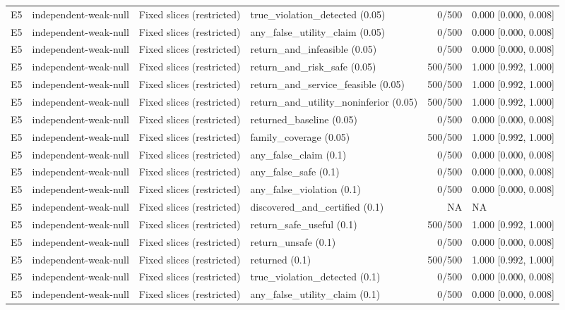 \begin{longtable}{p{.04\linewidth}p{.18\linewidth}p{.19\linewidth}p{.16\linewidth}r p{.21\linewidth}}
E5 & independent-weak-null & Fixed slices (restricted) & true\_violation\_detected (0.05) & 0/500 & 0.000 [0.000, 0.008]\\
E5 & independent-weak-null & Fixed slices (restricted) & any\_false\_utility\_claim (0.05) & 0/500 & 0.000 [0.000, 0.008]\\
E5 & independent-weak-null & Fixed slices (restricted) & return\_and\_infeasible (0.05) & 0/500 & 0.000 [0.000, 0.008]\\
E5 & independent-weak-null & Fixed slices (restricted) & return\_and\_risk\_safe (0.05) & 500/500 & 1.000 [0.992, 1.000]\\
E5 & independent-weak-null & Fixed slices (restricted) & return\_and\_service\_feasible (0.05) & 500/500 & 1.000 [0.992, 1.000]\\
E5 & independent-weak-null & Fixed slices (restricted) & return\_and\_utility\_noninferior (0.05) & 500/500 & 1.000 [0.992, 1.000]\\
E5 & independent-weak-null & Fixed slices (restricted) & returned\_baseline (0.05) & 0/500 & 0.000 [0.000, 0.008]\\
E5 & independent-weak-null & Fixed slices (restricted) & family\_coverage (0.05) & 500/500 & 1.000 [0.992, 1.000]\\
E5 & independent-weak-null & Fixed slices (restricted) & any\_false\_claim (0.1) & 0/500 & 0.000 [0.000, 0.008]\\
E5 & independent-weak-null & Fixed slices (restricted) & any\_false\_safe (0.1) & 0/500 & 0.000 [0.000, 0.008]\\
E5 & independent-weak-null & Fixed slices (restricted) & any\_false\_violation (0.1) & 0/500 & 0.000 [0.000, 0.008]\\
E5 & independent-weak-null & Fixed slices (restricted) & discovered\_and\_certified (0.1) & NA & NA\\
E5 & independent-weak-null & Fixed slices (restricted) & return\_safe\_useful (0.1) & 500/500 & 1.000 [0.992, 1.000]\\
E5 & independent-weak-null & Fixed slices (restricted) & return\_unsafe (0.1) & 0/500 & 0.000 [0.000, 0.008]\\
E5 & independent-weak-null & Fixed slices (restricted) & returned (0.1) & 500/500 & 1.000 [0.992, 1.000]\\
E5 & independent-weak-null & Fixed slices (restricted) & true\_violation\_detected (0.1) & 0/500 & 0.000 [0.000, 0.008]\\
E5 & independent-weak-null & Fixed slices (restricted) & any\_false\_utility\_claim (0.1) & 0/500 & 0.000 [0.000, 0.008]\\

\end{longtable}

